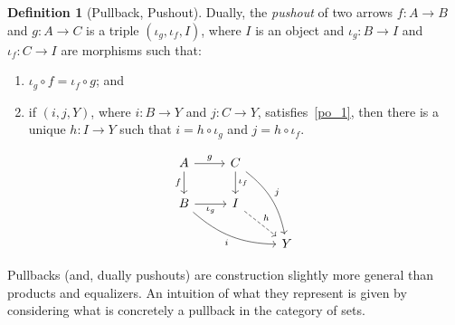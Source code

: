 \documentclass[a4paper, twoside,openright]{report}
\theoremstyle{plain}
\theoremstyle{definition}
\newtheorem{definition}[theorem]{Definition}
\begin{document}
\begin{definition}[Pullback, Pushout]
    Dually, the \emph{pushout} of two arrows $f: A \rightarrow B$ and $g: A\rightarrow C$ is a triple $(\iota_g, \iota_f, I)$, where $I$ is an object and $\iota_g:B \rightarrow I$ and $\iota_f: C \rightarrow I$ are morphisms such that:
    \begin{enumerate}
        \item\label{po_1} $\iota_g \circ f = \iota_f \circ g$; and 
        \item if $(i, j, Y)$, where $i: B \rightarrow Y$ and $j: C \rightarrow Y$, satisfies~\ref{po_1}, then there is a unique $h: I \rightarrow Y$ such that $i = h \circ \iota_g$ and $j = h \circ \iota_f$.  
    \end{enumerate}
    \[\begin{tikzcd}
        A & C \\
        B & I \\
        && Y
        \arrow["g", from=1-1, to=1-2]
        \arrow["f" swap, from=1-1, to=2-1]
        \arrow["{{\iota_f}}", from=1-2, to=2-2]
        \arrow["j", bend left=20, from=1-2, to=3-3]
        \arrow["{{\iota_g}}" swap, from=2-1, to=2-2]
        \arrow["i" swap, bend right=20, from=2-1, to=3-3]
        \arrow["h", dashed, from=2-2, to=3-3]
    \end{tikzcd}\]
    {%
    }
\end{definition}

Pullbacks (and, dually pushouts) are construction slightly more general than products and equalizers. An intuition of what they represent is given by considering what is concretely a pullback in the category of sets.
\end{document}
